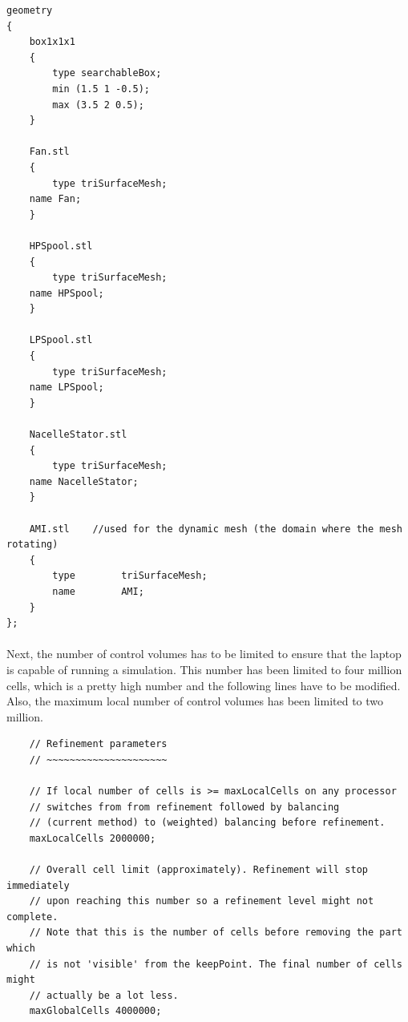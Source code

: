 \begin{footnotesize}
\begin{verbatim}
geometry
{
    box1x1x1
    {
        type searchableBox;
        min (1.5 1 -0.5);
        max (3.5 2 0.5);
    }

    Fan.stl
    {
        type triSurfaceMesh;
 	name Fan;
    }

    HPSpool.stl
    {
        type triSurfaceMesh;
	name HPSpool;
    }

    LPSpool.stl
    {
        type triSurfaceMesh;
	name LPSpool;
    }

    NacelleStator.stl
    {
        type triSurfaceMesh;
	name NacelleStator;
    }

    AMI.stl    //used for the dynamic mesh (the domain where the mesh  rotating)
    {
        type        triSurfaceMesh;
        name        AMI;
    }
};
\end{verbatim}
\end{footnotesize}

\paragraph{}Next, the number of control volumes has to be limited to ensure that the laptop is capable of running a simulation. This number has been limited to four million cells, which is a pretty high number and the following lines have to be modified. Also, the maximum local number of control volumes has been limited to two million.

\begin{footnotesize}
\begin{verbatim}
    // Refinement parameters
    // ~~~~~~~~~~~~~~~~~~~~~

    // If local number of cells is >= maxLocalCells on any processor
    // switches from from refinement followed by balancing
    // (current method) to (weighted) balancing before refinement.
    maxLocalCells 2000000;

    // Overall cell limit (approximately). Refinement will stop immediately
    // upon reaching this number so a refinement level might not complete.
    // Note that this is the number of cells before removing the part which
    // is not 'visible' from the keepPoint. The final number of cells might
    // actually be a lot less.
    maxGlobalCells 4000000;
\end{verbatim}
\end{footnotesize}


